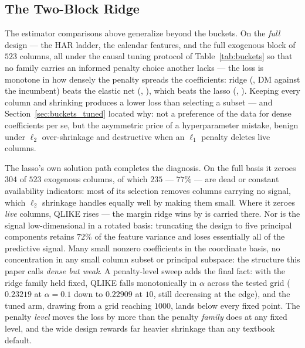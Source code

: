 \subsection{The Two-Block Ridge}
\label{sec:dense_weak}
\label{sec:dense_weak_twoblock}

\label{sec:dense_weak_headtohead}
The estimator comparisons above generalize beyond the buckets. On the
\emph{full} design --- the HAR ladder, the calendar features, and the
full exogenous block of $523$ columns, all under the causal tuning
protocol of Table~\ref{tab:buckets} so that no family carries an
informed penalty choice another lacks --- the loss is monotone in how
densely the penalty spreads the coefficients: ridge
(\unifBOneRidgeTunedQLIKE{}, DM \unifBOneRidgeTunedDM{} against the
incumbent) beats the elastic net (\unifBThreeEnetTunedQLIKE{},
\unifBThreeEnetTunedDM{}), which beats the lasso
(\unifBTwoLassoTunedQLIKE{}, \unifBTwoLassoTunedDM{}). Keeping every
column and shrinking produces a lower loss than selecting a subset ---
and Section~\ref{sec:buckets_tuned} located why: not a preference of
the data for dense coefficients per se, but the asymmetric price of a
hyperparameter mistake, benign under $\ell_2$ over-shrinkage and
destructive when an $\ell_1$ penalty deletes live columns.

The lasso's own solution path completes the diagnosis. On the full
basis it zeroes $304$ of $523$ exogenous columns, of which $235$ ---
$77\%$ --- are dead or constant availability indicators: most of its
selection removes columns carrying no signal, which $\ell_2$ shrinkage
handles equally well by making them small. Where it zeroes \emph{live}
columns, QLIKE rises --- the margin ridge wins by is carried there. Nor
is the signal low-dimensional in a rotated basis: truncating the design
to five principal components retains $72\%$ of the feature variance and
loses essentially all of the predictive signal. Many small nonzero
coefficients in the coordinate basis, no concentration in any small
column subset or principal subspace: the structure this paper calls
\emph{dense but weak}. A penalty-level sweep adds the final fact: with
the ridge family held fixed, QLIKE falls monotonically in $\alpha$
across the tested grid ($0.23219$ at $\alpha = 0.1$ down to $0.22909$
at $10$, still decreasing at the edge), and the tuned arm, drawing from
a grid reaching $1000$, lands below every fixed point. The penalty
\emph{level} moves the loss by more than the penalty \emph{family} does
at any fixed level, and the wide design rewards far heavier shrinkage
than any textbook default.


